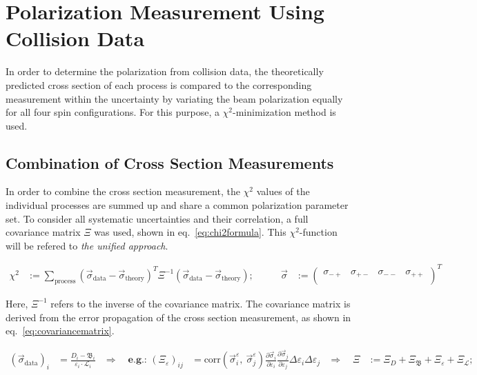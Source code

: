 \documentclass[a4paper]{article}
\begin{document}
\section{Polarization Measurement Using Collision Data}

In order to determine the polarization from collision data, the theoretically predicted cross section of each process is compared to the corresponding measurement within the uncertainty by variating the beam polarization equally for all four spin configurations. For this purpose, a $\chi^{2}$-minimization method is used.

\subsection{Combination of Cross Section Measurements}

In order to combine the cross section measurement, the $\chi^{2}$ values of the individual processes are summed up and share a common polarization parameter set. To consider all systematic uncertainties and their correlation, a full covariance matrix $\Xi$ was used, shown in eq.~\ref{eq:chi2formula}. This $\chi^{2}$-function will be refered to \textit{the unified approach}.

\begin{align}
\chi^{2} &:=
\sum_{\text{process}}{
\left(\vec{\sigma}_{\text{data}} - \vec{\sigma}_{\text{theory}}\right)^{T}\Xi^{-1}
\left(\vec{\sigma}_{\text{data}} - \vec{\sigma}_{\text{theory}}\right)
};&\qquad
\vec{\sigma} &:= \begin{pmatrix}
\sigma_{-+} & \sigma_{+-} & \sigma_{--} & \sigma_{++}\\
\end{pmatrix}^{T}
\label{eq:chi2formula}
\end{align}

Here, $\Xi^{-1}$ refers to the inverse of the covariance matrix. The covariance matrix is derived from the error propagation of the cross section measurement, as shown in eq.~\ref{eq:covariancematrix}.

\begin{align}
\left(\vec{\sigma}_{\text{data}}\right)_{i} &= \frac{D_{i} - \mathfrak{B}_{i}}{\varepsilon_{i}\cdot\mathcal{L}_{i}}
&\Rightarrow\quad\textbf{e.g.: }\left(\Xi_{\varepsilon}\right)_{ij} &= 
	\text{corr}\left(\vec{\sigma}_{i}^{\varepsilon},\ \vec{\sigma}_{j}^{\varepsilon}\right)
	\frac{\partial\vec{\sigma}_{i}}{\partial\varepsilon_{i}}\frac{\partial\vec{\sigma}_{j}}{\partial\varepsilon_{j}}
	\Delta\varepsilon_{i}\Delta\varepsilon_{j}
&\Rightarrow\quad\Xi &:= \Xi_{D} + \Xi_{\mathfrak{B}} + \Xi_{\varepsilon} + \Xi_{\mathcal{L}};
\label{eq:covariancematrix}
\end{align}
\end{document}
